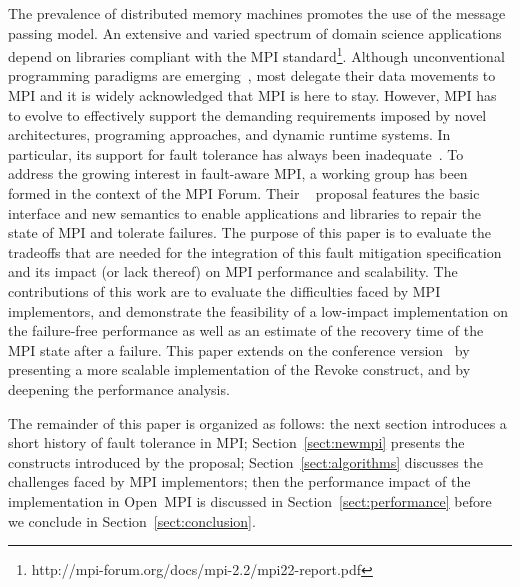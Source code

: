 The prevalence of distributed memory machines promotes the use of the message
passing model. An extensive and varied spectrum of domain science applications
depend on libraries compliant with the MPI
standard\footnote{http://mpi-forum.org/docs/mpi-2.2/mpi22-report.pdf}.
Although unconventional programming paradigms are
emerging~\cite{springerlink:10.1007/978-3-540-79561-2_4,springerlink:10.1007/978-3-642-19328-6_5},
most delegate their data movements to MPI and it is widely acknowledged that MPI
is here to stay. However,  MPI has to evolve to effectively support the demanding requirements
imposed by novel architectures, programing approaches, and dynamic runtime
systems.  In particular, its support for fault tolerance 
has always been inadequate~\cite{Gropp:2004:FTM:1080704.1080714}.  To address
the growing interest in fault-aware MPI, a working group has been formed in the
context of the MPI Forum. Their 
\ulfm~\cite{BlandULFMTechReport} proposal features the basic interface and new semantics to
enable applications and libraries to repair the state of MPI and tolerate failures. The purpose of this paper is to evaluate the tradeoffs that are needed for the
integration of this fault mitigation specification and its impact (or lack
thereof) on MPI performance and scalability. The contributions of this work are
to evaluate the difficulties faced by MPI implementors, and demonstrate the
feasibility of a low-impact implementation on the failure-free performance as
well as an estimate of the recovery time of the MPI state after a failure.
This paper extends on the conference version~\cite{DBLP:conf/pvm/BlandBHHBD12} by presenting a more 
scalable implementation of the Revoke construct, and by deepening the 
performance analysis. 

The remainder of this paper is organized as follows: the next section introduces
a short history of fault tolerance in MPI; Section~\ref{sect:newmpi} presents
the constructs introduced by the proposal; Section~\ref{sect:algorithms}
discusses the challenges faced by MPI implementors; then the performance impact
of the implementation in Open~MPI is discussed in Section~\ref{sect:performance}
before we conclude in Section~\ref{sect:conclusion}.
